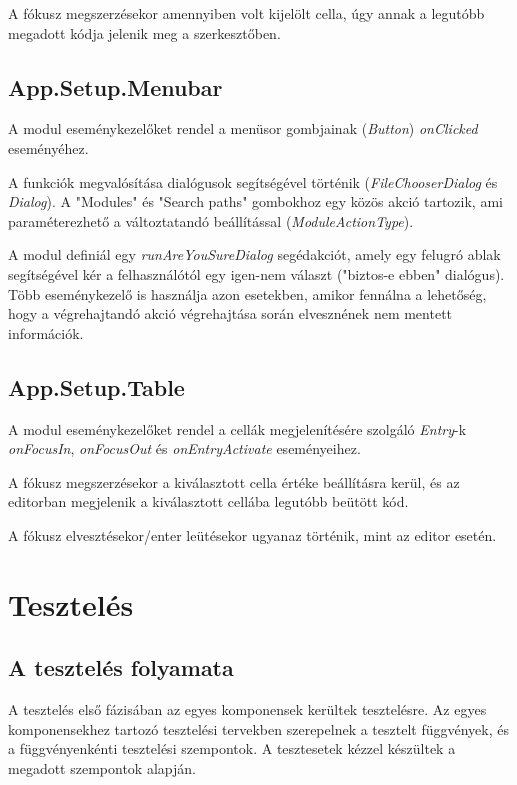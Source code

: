A fókusz megszerzésekor amennyiben volt kijelölt cella, úgy annak a legutóbb megadott kódja jelenik meg a szerkesztőben.

\subsection{App.Setup.Menubar}

A modul eseménykezelőket rendel a menüsor gombjainak (\textit{Button}) \textit{onClicked} eseményéhez.

A funkciók megvalósítása dialógusok segítségével történik (\textit{FileChooserDialog} és \textit{Dialog}). A "Modules" és "Search paths" gombokhoz egy közös akció tartozik, ami paraméterezhető a változtatandó beállítással (\textit{ModuleActionType}). 

A modul definiál egy \textit{runAreYouSureDialog} segédakciót, amely egy felugró ablak segítségével kér a felhasználótól egy igen-nem választ ("biztos-e ebben" dialógus). Több eseménykezelő is használja azon esetekben, amikor fennálna a lehetőség, hogy a végrehajtandó akció végrehajtása során elvesznének nem mentett információk.

\subsection{App.Setup.Table}

A modul eseménykezelőket rendel a cellák megjelenítésére szolgáló \textit{Entry}-k \textit{onFocusIn}, \textit{onFocusOut} és \textit{onEntryActivate} eseményeihez.

A fókusz megszerzésekor a kiválasztott cella értéke beállításra kerül, 
és az editorban megjelenik a kiválasztott cellába legutóbb beütött kód.

A fókusz elvesztésekor/enter leütésekor ugyanaz történik, mint az editor esetén.
\section{Tesztelés}

\subsection{A tesztelés folyamata}

A tesztelés első fázisában az egyes komponensek kerültek tesztelésre. Az egyes komponensekhez tartozó tesztelési tervekben szerepelnek a tesztelt függvények, és a függvényenkénti tesztelési szempontok. A tesztesetek kézzel készültek a megadott szempontok alapján. 

